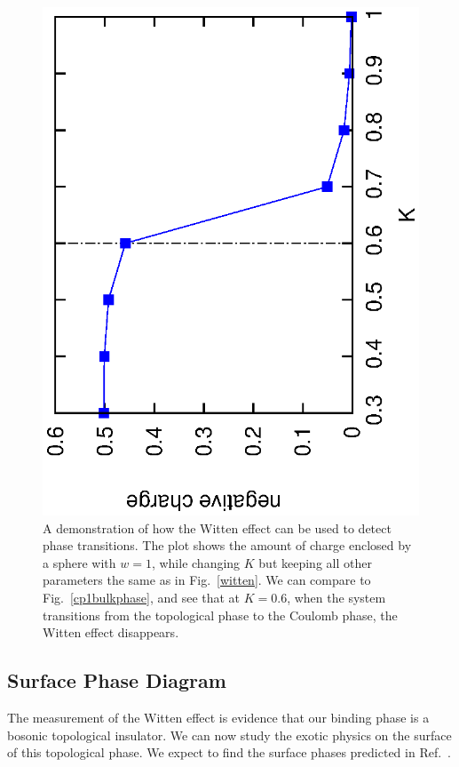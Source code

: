 \documentclass[prb,twocolumn]{revtex4-1}
\newcommand{\scripty}[1]{w}
\begin{document}
\begin{figure}
\includegraphics[angle=-90,width=\linewidth]{figures/wittenphase.eps}
\caption{A demonstration of how the Witten effect can be used to detect phase transitions. The plot shows the amount of charge enclosed by a sphere with $\scripty{r}=1$, while changing $K$ but keeping all other parameters the same as in Fig.~\ref{witten}. We can compare to Fig.~\ref{cp1bulkphase}, and see that at $K=0.6$, when the system transitions from the topological phase to the Coulomb phase, the Witten effect disappears.}
\label{wittenphase}
\end{figure}


\subsection{Surface Phase Diagram}

The measurement of the Witten effect is evidence that our binding phase is a bosonic topological insulator. We can now study the exotic physics on the surface of this topological phase. We expect to find the surface phases predicted in Ref.~.
\end{document}
